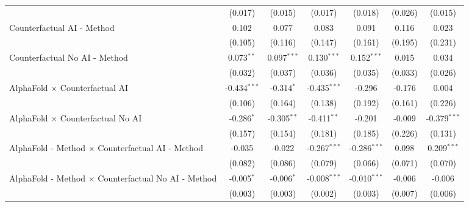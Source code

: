 \begin{tabular}{lcccccc}
                                                              & (0.017)        & (0.015)       & (0.017)        & (0.018)        & (0.026)       & (0.015)\\   
   Counterfactual AI - Method                                 & 0.102          & 0.077         & 0.083          & 0.091          & 0.116         & 0.023\\   
                                                              & (0.105)        & (0.116)       & (0.147)        & (0.161)        & (0.195)       & (0.231)\\   
   Counterfactual No AI - Method                              & 0.073$^{**}$   & 0.097$^{***}$ & 0.130$^{***}$  & 0.152$^{***}$  & 0.015         & 0.034\\   
                                                              & (0.032)        & (0.037)       & (0.036)        & (0.035)        & (0.033)       & (0.026)\\   
   AlphaFold $\times$ Counterfactual AI                       & -0.434$^{***}$ & -0.314$^{*}$  & -0.435$^{***}$ & -0.296         & -0.176        & 0.004\\   
                                                              & (0.106)        & (0.164)       & (0.138)        & (0.192)        & (0.161)       & (0.226)\\   
   AlphaFold $\times$ Counterfactual No AI                    & -0.286$^{*}$   & -0.305$^{**}$ & -0.411$^{**}$  & -0.201         & -0.009        & -0.379$^{***}$\\   
                                                              & (0.157)        & (0.154)       & (0.181)        & (0.185)        & (0.226)       & (0.131)\\   
   AlphaFold - Method $\times$ Counterfactual AI - Method     & -0.035         & -0.022        & -0.267$^{***}$ & -0.286$^{***}$ & 0.098         & 0.209$^{***}$\\   
                                                              & (0.082)        & (0.086)       & (0.079)        & (0.066)        & (0.071)       & (0.070)\\   
   AlphaFold - Method $\times$ Counterfactual No AI - Method  & -0.005$^{*}$   & -0.006$^{*}$  & -0.008$^{***}$ & -0.010$^{***}$ & -0.006        & -0.006\\   
                                                              & (0.003)        & (0.003)       & (0.002)        & (0.003)        & (0.007)       & (0.006)\\   

\end{tabular}
